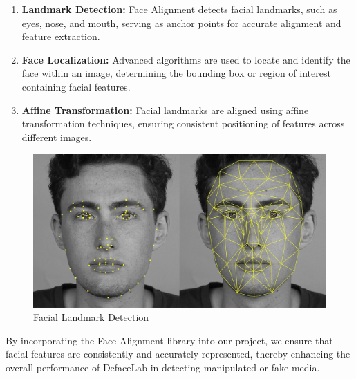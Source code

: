 \begin{enumerate}
    \item \textbf{Landmark Detection:} Face Alignment detects facial landmarks, such as eyes, nose, and mouth, serving as anchor points for accurate alignment and feature extraction.

    \item \textbf{Face Localization:} Advanced algorithms are used to locate and identify the face within an image, determining the bounding box or region of interest containing facial features.

    \item \textbf{Affine Transformation:} Facial landmarks are aligned using affine transformation techniques, ensuring consistent positioning of features across different images.


\end{enumerate}

\begin{figure}[htbp]
    \centering
    \includegraphics[width=5in]{img/facial feature.jpg}
    \caption{Facial Landmark Detection}
\end{figure}

By incorporating the Face Alignment library into our project, we ensure that facial features are consistently and accurately represented, thereby enhancing the overall performance of DefaceLab in detecting manipulated or fake media.

\newpage